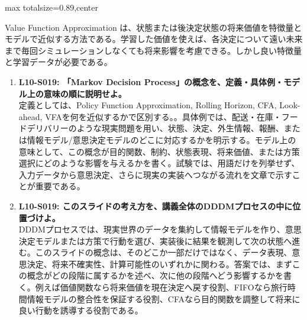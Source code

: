 \begin{minipage}[t]{0.58\textwidth}
\begin{adjustbox}{max totalsize={\textwidth}{0.89\textheight},center}
\begin{minipage}{\textwidth}
Value Function Approximation は、状態または後決定状態の将来価値を特徴量とモデルで近似する方法である。学習した価値を使えば、各決定について遠い未来まで毎回シミュレーションしなくても将来影響を考慮できる。しかし良い特徴量と学習データが必要である。\par{}\begin{enumerate}\item \textbf{L10-S019: 「Markov Decision Process」の概念を、定義・具体例・モデル上の意味の順に説明せよ。}\\定義としては、Policy Function Approximation, Rolling Horizon, CFA, Look-ahead, VFAを何を近似するかで区別する。。具体例では、配送・在庫・フードデリバリーのような現実問題を用い、状態、決定、外生情報、報酬、または情報モデル/意思決定モデルのどこに対応するかを明示する。モデル上の意味として、この概念が目的関数、制約、状態表現、将来価値、または方策選択にどのような影響を与えるかを書く。試験では、用語だけを列挙せず、入力データから意思決定、さらに現実の実装へつながる流れを文章で示すことが重要である。\item \textbf{L10-S019: このスライドの考え方を、講義全体のDDDMプロセスの中に位置づけよ。}\\DDDMプロセスでは、現実世界のデータを集約して情報モデルを作り、意思決定モデルまたは方策で行動を選び、実装後に結果を観測して次の状態へ進む。このスライドの概念は、そのどこか一部だけではなく、データ表現、意思決定、将来不確実性、計算可能性のいずれかに関わる。答案では、まずこの概念がどの段階に属するかを述べ、次に他の段階へどう影響するかを書く。例えば価値関数なら将来価値を現在決定へ戻す役割、FIFOなら旅行時間情報モデルの整合性を保証する役割、CFAなら目的関数を調整して将来に良い行動を誘導する役割である。\end{enumerate}
\end{minipage}
\end{adjustbox}
\end{minipage}


